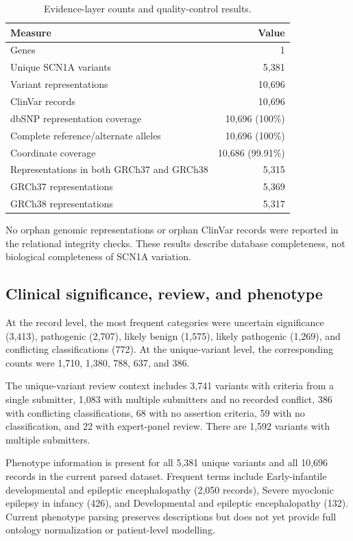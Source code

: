 \documentclass[12pt,a4paper]{article}
\begin{document}
\begin{table}[H]
\centering
\small
\caption{Evidence-layer counts and quality-control results.}
\label{tab:coverage}
\begin{tabular}{lr}
\toprule
Measure & Value\\
\midrule
Genes & 1\\
Unique SCN1A variants & 5,381\\
Variant representations & 10,696\\
ClinVar records & 10,696\\
dbSNP representation coverage & 10,696 (100\%)\\
Complete reference/alternate alleles & 10,696 (100\%)\\
Coordinate coverage & 10,686 (99.91\%)\\
Representations in both GRCh37 and GRCh38 & 5,315\\
GRCh37 representations & 5,369\\
GRCh38 representations & 5,317\\
\bottomrule
\end{tabular}
\end{table}

No orphan genomic representations or orphan ClinVar records were reported in the relational integrity checks. These results describe database completeness, not biological completeness of SCN1A variation.

\subsection{Clinical significance, review, and phenotype}
At the record level, the most frequent categories were uncertain significance (3,413), pathogenic (2,707), likely benign (1,575), likely pathogenic (1,269), and conflicting classifications (772). At the unique-variant level, the corresponding counts were 1,710, 1,380, 788, 637, and 386.

The unique-variant review context includes 3,741 variants with criteria from a single submitter, 1,083 with multiple submitters and no recorded conflict, 386 with conflicting classifications, 68 with no assertion criteria, 59 with no classification, and 22 with expert-panel review. There are 1,592 variants with multiple submitters.

Phenotype information is present for all 5,381 unique variants and all 10,696 records in the current parsed dataset. Frequent terms include Early-infantile developmental and epileptic encephalopathy (2,050 records), Severe myoclonic epilepsy in infancy (426), and Developmental and epileptic encephalopathy (132). Current phenotype parsing preserves descriptions but does not yet provide full ontology normalization or patient-level modelling.
\end{document}
